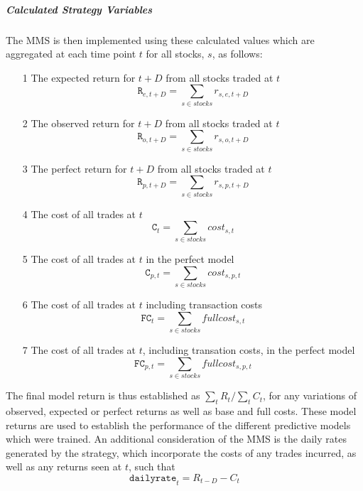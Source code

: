\documentclass[a4paper,11pt,oneside]{article}
\theoremstyle{plain}
\theoremstyle{definition}
\begin{document}
\hfill\break

\subparagraph{Calculated Strategy Variables} The MMS  is then implemented using these calculated values which are aggregated at each time point $t$ for all stocks, $s$, as follows:

\begin{itemize}
	\item [1] The expected return for $t+D$ from all stocks traded at $t$
					\begin{equation}
					\texttt{R}_{e, {t+D}} = \sum_{s \in stocks} r_{s, e, {t+D}}
					\end{equation}
	\item [2] The observed return for $t+D$ from all stocks traded at $t$
					\begin{equation}
					\texttt{R}_{o, {t+D}} = \sum_{s \in stocks} r_{s, o, {t+D}}
					\end{equation}
	\item [3] The perfect return for $t+D$ from all stocks traded at $t$
					\begin{equation}
					\texttt{R}_{p, {t+D}} = \sum_{s \in stocks} r_{s, p, {t+D}}
					\end{equation}
	\item [4] The cost of all trades at $t$
					\begin{equation}
					\texttt{C}_t = \sum_{s \in stocks} cost_{s,t}
					\end{equation}
	\item [5] The cost of all trades at $t$ in the perfect model
					\begin{equation}
					\texttt{C}_{p,t} = \sum_{s \in stocks} cost_{s, p ,t}
					\end{equation}
	\item [6] The cost of all trades at $t$ including transaction costs
					\begin{equation}
					\texttt{FC}_t = \sum_{s \in stocks} fullcost_{s,t}
					\end{equation}
	\item [7] The cost of all trades at $t$, including transation costs, in the perfect model	
					\begin{equation}
					\texttt{FC}_{p,t} = \sum_{s \in stocks} fullcost_{s, p ,t}
					\end{equation}	
\end{itemize}
\hfill\break
The final model return is thus established as $\sum_t{R_t} / \sum_t{C_t} $, for any variations of observed, expected or perfect returns as well as base and full costs. These model returns are used to establish the performance of the different predictive models which were trained.\newline
\hfill\break
An additional consideration of the MMS is the daily rates generated by the strategy, which incorporate the costs of any trades incurred, as well as any returns seen at $t$, such that 
\begin{equation}
\texttt{dailyrate}_t = R_{t-D} - C_t
\end{equation}
\end{document}
